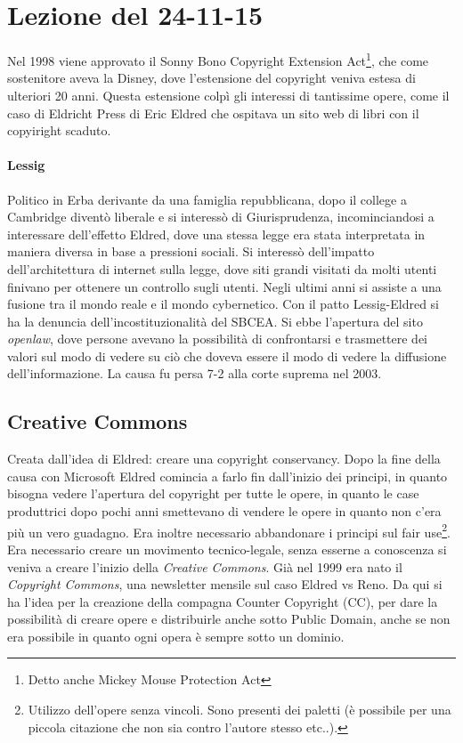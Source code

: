 \section{Lezione del 24-11-15}

Nel 1998 viene approvato il Sonny Bono Copyright Extension Act\footnote{Detto anche Mickey Mouse Protection Act}, che come sostenitore aveva la Disney, dove l'estensione del copyright veniva estesa di ulteriori 20 anni. Questa estensione colp\`i gli interessi di tantissime opere, come il caso di Eldricht Press di Eric Eldred che ospitava un sito web di libri con il copyiright scaduto.


\paragraph*{Lessig}Politico in Erba derivante da una famiglia repubblicana, dopo il college a Cambridge divent\`o liberale e si interess\`o di Giurisprudenza, incominciandosi a interessare dell'effetto Eldred, dove una stessa legge era stata interpretata in maniera diversa in base a pressioni sociali. Si interess\`o dell'impatto dell'architettura di internet sulla legge, dove siti grandi visitati da molti utenti finivano per ottenere un controllo sugli utenti.
Negli ultimi anni si assiste a una fusione tra il mondo reale e il mondo cybernetico.
Con il patto Lessig-Eldred si ha la denuncia dell'incostituzionalit\`a del SBCEA. Si ebbe l'apertura del sito \textit{openlaw}, dove persone avevano la possibilit\`a di confrontarsi e trasmettere dei valori sul modo di vedere su ci\`o che doveva essere il modo di vedere la diffusione dell'informazione. La causa fu persa 7-2 alla corte suprema nel 2003.

\subsection{Creative Commons}

Creata dall'idea di Eldred: creare una copyright conservancy. Dopo la fine della causa con Microsoft Eldred comincia a farlo fin dall'inizio dei principi, in quanto bisogna vedere l'apertura del copyright per tutte le opere, in quanto le case produttrici dopo pochi anni smettevano di vendere le opere in quanto non c'era pi\`u un vero guadagno. Era inoltre necessario abbandonare i principi sul fair use\footnote{Utilizzo dell'opere senza vincoli. Sono presenti dei paletti (\`e possibile per una piccola citazione che non sia contro l'autore stesso etc..).}. Era necessario creare un movimento tecnico-legale, senza esserne a conoscenza si veniva a creare l'inizio della \textit{Creative Commons}. Gi\`a nel 1999 era nato il \textit{Copyright Commons}, una newsletter mensile sul caso Eldred vs Reno. Da qui si ha l'idea per la creazione della compagna Counter Copyright (CC), per dare la possibilit\`a di creare opere e distribuirle anche sotto Public Domain, anche se non era possibile in quanto ogni opera \`e sempre sotto un dominio.


